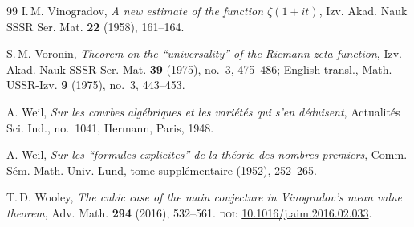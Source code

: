 \documentclass[11pt]{amsart}
\theoremstyle{definition}
\theoremstyle{remark}
\begin{document}
\begin{thebibliography}{99}
I.\,M. Vinogradov,
\textit{A new estimate of the function $\zeta(1+it)$},
Izv. Akad. Nauk SSSR Ser. Mat. \textbf{22} (1958), 161--164.

S.\,M. Voronin,
\textit{Theorem on the ``universality'' of the Riemann zeta-function},
Izv. Akad. Nauk SSSR Ser. Mat. \textbf{39} (1975), no.~3, 475--486; English transl., Math. USSR-Izv. \textbf{9} (1975), no.~3, 443--453.

A. Weil,
\textit{Sur les courbes alg\'ebriques et les vari\'et\'es qui s'en d\'eduisent},
Actualit\'es Sci. Ind., no.~1041,
Hermann, Paris, 1948.

A. Weil,
\textit{Sur les ``formules explicites'' de la th\'eorie des nombres premiers},
Comm. S\'em. Math. Univ. Lund, tome suppl\'ementaire (1952), 252--265.

T.\,D. Wooley,
\textit{The cubic case of the main conjecture in Vinogradov's mean value theorem},
Adv. Math. \textbf{294} (2016), 532--561.
\textsc{doi:} \href{https://doi.org/10.1016/j.aim.2016.02.033}{10.1016/j.aim.2016.02.033}.

\end{thebibliography}
\end{document}
